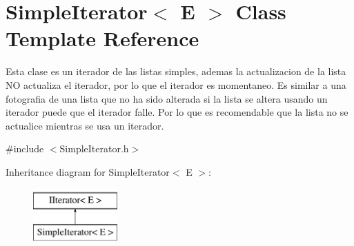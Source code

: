 \hypertarget{class_simple_iterator}{\section{Simple\-Iterator$<$ E $>$ Class Template Reference}
\label{class_simple_iterator}
}


Esta clase es un iterador de las listas simples, ademas la actualizacion de la lista N\-O actualiza el iterador, por lo que el iterador es momentaneo. Es similar a una fotografia de una lista que no ha sido alterada si la lista se altera usando un iterador puede que el iterador falle. Por lo que es recomendable que la lista no se actualice mientras se usa un iterador.  




{\ttfamily \#include $<$Simple\-Iterator.\-h$>$}

Inheritance diagram for Simple\-Iterator$<$ E $>$\-:\begin{figure}[H]
\begin{center}
\leavevmode
\includegraphics[height=2.000000cm]{class_simple_iterator}
\end{center}
\end{figure}
